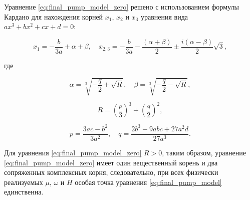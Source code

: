 Уравнение \eqref{eq:final_pump_model_zero} решено с использованием формулы Кардано для нахождения корней $x_1$, $x_2$ и $x_3$ уравнения вида $ax^3 + bx^2 + cx + d = 0$:

\begin{equation}
x_1 = -\frac{b}{3a} + \alpha + \beta, \quad x_{2, 3} = -\frac{b}{3a}  - \frac{(\alpha + \beta)}{2} \pm \frac{i(\alpha - \beta)}{2}\sqrt{3},
\label{eq:cardano_1}
\end{equation}

где 

\begin{equation}
\alpha = \sqrt[3]{-\frac{q}{2} + \sqrt{R}}, \quad \beta = \sqrt[3]{-\frac{q}{2} - \sqrt{R}},
\label{eq:cardano_2}
\end{equation}

\begin{equation}
R = \left(\frac{p}{3}\right)^3 + \left( \frac{q}{2} \right)^2,
\label{eq:cardano_3}
\end{equation}

\begin{equation}
p = \frac{3ac - b^2}{3a^2}, \quad q = \frac{2b^3 - 9abc + 27a^2d}{27a^3}.
\label{eq:cardano_extension}
\end{equation}

Для уравнения \eqref{eq:final_pump_model_zero} $R > 0$, таким образом, уравнение \eqref{eq:final_pump_model_zero} имеет один вещественный корень и два сопряженных комплексных корня, следовательно, при всех физически реализуемых $\mu$, $\omega$ и $H$ особая точка уравнения \eqref{eq:final_pump_model} единственна.%






